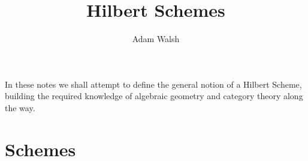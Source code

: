 \documentclass[a4paper]{amsart}
\title{Hilbert Schemes}
\author{Adam Walsh}
\begin{document}
\maketitle

In these notes we shall attempt to define the general notion of a Hilbert Scheme, building the required knowledge of algebraic geometry and category theory along the way.

\section{Schemes}
\end{document}

